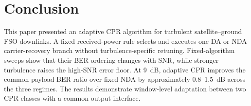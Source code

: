 \section{Conclusion}
\label{sec:conclusion}

This paper presented an adaptive CPR algorithm for turbulent satellite--ground FSO downlinks. A fixed received-power rule selects and executes one DA or NDA carrier-recovery branch without turbulence-specific retuning. Fixed-algorithm sweeps show that their BER ordering changes with SNR, while stronger turbulence raises the high-SNR error floor. At 9~dB, adaptive CPR improves the common-payload BER ratio over fixed NDA by approximately 0.8--1.5~dB across the three regimes. The results demonstrate window-level adaptation between two CPR classes with a common output interface.
